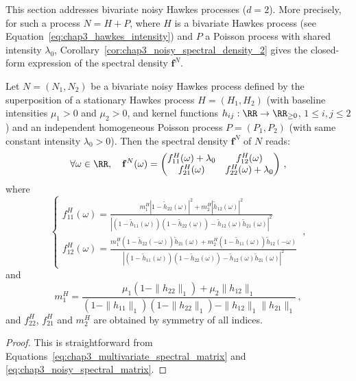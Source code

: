       This section addresses bivariate noisy Hawkes processes ($d=2$).
      More precisely, for such a process $N = H + P$, where $H$ is a bivariate Hawkes process (see Equation~\eqref{eq:chap3_hawkes_intensity}) and $P$ a Poisson process with shared intensity $\lambda_0$,
      Corollary~\ref{cor:chap3_noisy_spectral_density_2} gives the closed-form expression of the spectral density $\mathbf f^N$.
      \begin{corollary}\label{cor:chap3_noisy_spectral_density_2}
        Let $N = (N_1, N_2)$ be a bivariate noisy Hawkes process defined by the superposition of a stationary Hawkes process $H = (H_1, H_2)$
        (with baseline intensities $\mu_1 > 0$ and $\mu_2 > 0$, and kernel functions $h_{ij} : \RR \to \RR_{\geq 0}$, $1 \le i, j \le 2$)
        and an independent homogeneous Poisson process $P = (P_1, P_2)$ (with same constant intensity $\lambda_0 > 0$).
        Then the spectral density $\mathbf f^N$ of $N$ reads:
        \begin{equation*}
          \forall \omega \in \RR, \quad
          \mathbf f^N(\omega) =
          \begin{pmatrix}
            f_{11}^H(\omega) + \lambda_0 & f_{12}^H(\omega) \\
            f_{21}^H(\omega) & f_{22}^H(\omega) + \lambda_0
          \end{pmatrix} \,,
        \end{equation*}
        where
        \[
          \begin{cases}
            f_{11}^H (\omega) = \frac{m_1^H \left \lvert 1 - \tilde h_{22}(\omega) \right \rvert^2 + m_2^H \left \lvert  \tilde h_{12}(\omega) \right \rvert^2}{\left \lvert \left (1-\tilde h_{11}(\omega) \right) \left (1-\tilde h_{22}(\omega) \right) - \tilde h_{12}(\omega) \tilde h_{21}(\omega) \right \rvert^2}\\
            f_{12}^H(\omega) = \frac{m_1^H \left(1-\tilde h_{22}(-\omega) \right)\tilde h_{21}(\omega) + m_2^H \left (1-\tilde h_{11}(\omega) \right) \tilde h_{12}(-\omega)}{\left \lvert \left (1-\tilde h_{11}(\omega) \right) \left (1-\tilde h_{22}(\omega) \right) - \tilde h_{12}(\omega) \tilde h_{21}(\omega) \right \rvert^2}
          \end{cases} \,,
        \]
        and
        \[
          m_1^H = \frac{\mu_1\left( 1 - \|h_{22}\|_1 \right)  + \mu_2 \|h_{12}\|_1 }{\left( 1 - \|h_{11}\|_1 \right)\left( 1 - \|h_{22}\|_1 \right) - \|h_{12}\|_1 \|h_{21}\|_1} \, ,
        \]
        and $f_{22}^H$, $f_{21}^H$ and $m_2^H$ are obtained by symmetry of all indices.
      \end{corollary}
      \begin{proof}
        This is straightforward from Equations~\eqref{eq:chap3_multivariate_spectral_matrix} and \eqref{eq:chap3_noisy_spectral_matrix}.
      \end{proof}
      
